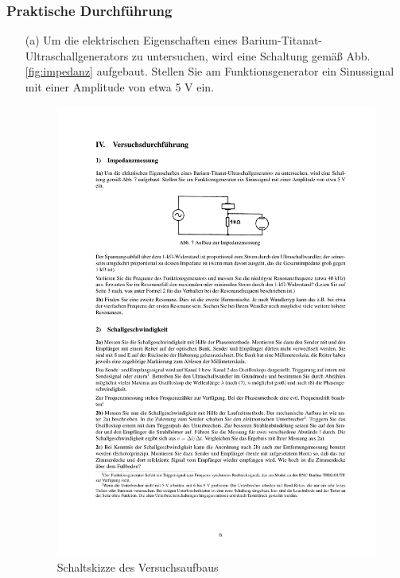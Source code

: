 \documentclass[12pt]{scrartcl}
\begin{document}
\subsubsection{Praktische Durchführung}
\begin{itemize}
\item[(a)]
Um die elektrischen Eigenschaften eines Barium-Titanat-Ultraschallgenerators zu untersuchen, wird eine Schaltung gemäß Abb. \ref{fig:impedanz}
aufgebaut. Stellen Sie am Funktionsgenerator ein Sinussignal mit einer Amplitude von etwa 5 V ein.
\begin{figure}[htbp] 
  \centering
    \includegraphics[trim = 20mm 210mm 20mm 55mm, clip, scale = 1]{impedanz.pdf}
  	\caption[Schaltskizze des Versuchsaufbaus]{Schaltskizze des Versuchsaufbaus\footnotemark}

\end{figure}
\end{itemize}
\end{document}
